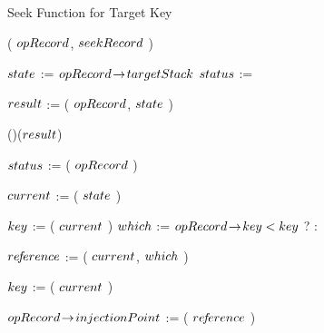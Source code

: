 \begin{limitscope}
\begin{algorithm}[tb]
\caption{Seek Function for Target Key} 
\label{algo:local-seek}
\DefineKeyWords
\DontPrintSemicolon
\Boolean \SeekForTarget( $opRecord$, $seekRecord$ )\;
\PrintSemicolon
\label{lin:local-seek:begin}
\Begin
{
   
   $state$ := $opRecord \!\rightarrow\! targetStack$\;
	 $\status$ := \DONOTKNOW\;
	 
	 \BlankLine
	
	 
	 \While{$\status$ = \DONOTKNOW}
	 { 
	    \label{lin:local-seek:while:begin}
      $result$ := \FindStartPoint( $opRecord$, $state$ )\;
	    \label{lin:local-seek:while:find|start|point} 
			
			\If(){\LNot($result$)} 
			{
			   $\status$ := \ExamineTop( $opRecord$ )\;
				 \Continue\;
				    
			}
			
      $current$ := \GetTop( $state$ )\;
			\label{lin:local-seek:while:traversal:begin}
	    \While{\True}
	    {
			  \label{lin:local-seek:while:traversal:first}
	       $\cKey$ := \GetKey( $current$ )\;
		     $which$ := $opRecord \!\rightarrow\! key < key$ ? \LEFT{} : \RIGHT{}\;
				 \label{lin:local-seek:while:traversal:select}
		    
		     $re\!f\!erence$ := \GetChild( $current$, $which$ )\;
			   		
		     \BlankLine
				
			   {
				    \label{lin:local-seek:while:traversal:stop:begin}
						
						{
						   $\cKey$ := \GetKey( $current$ )
						}
						
												
						\uIf{$\opRecord \rarrow \key$ $\not=$ $\cKey$}
				    {
							 \If{$\opRecord \rarrow \type$ = \INSERT}
							 {
							    $opRecord \!\rightarrow\! injectionPoint$ :=  \GetAddress( $re\!f\!erence$ )\;
									\label{lin:local-seek:while:traversal:store|injection}
							 }
							
}}}}}
\end{algorithm}
\end{limitscope}
